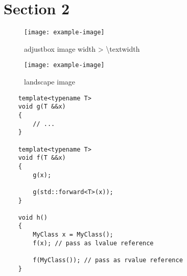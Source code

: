 \documentclass[a4paper, english, final]{article}
\newenvironment{code}{\captionsetup{type=listing}}{}
\begin{document}
\section{Section 2}
\lipsum[1][1-5]

\begin{figure}[H]
    \centering
    \texttt{[image: example-image]}
    \caption{adjustbox image width > \textbackslash textwidth}
    \label{fig:id}
\end{figure}

{
\begin{landscape}
    \begin{figure}
        \texttt{[image: example-image]}
        \caption{landscape image}
        \label{fig:id2}
    \end{figure}
\end{landscape}
\restoregeometry
\clearpage
}

\begin{code}
\caption{Code block}
\label{code:code block}
\begin{verbatim}
    template<typename T>
    void g(T &&x)
    {
        // ...
    }
    
    template<typename T>
    void f(T &&x)
    {
        g(x);
    
        g(std::forward<T>(x));
    }
    
    void h()
    {
        MyClass x = MyClass();
        f(x); // pass as lvalue reference
        
        f(MyClass()); // pass as rvalue reference
    }
\end{verbatim}
\end{code}

{
\newpage
\nocite{*} %
\printbibliography[heading=bibnumbered,title={Bibliography}]
}
\end{document}
